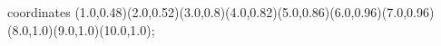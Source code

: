 					coordinates { (1.0,0.48)(2.0,0.52)(3.0,0.8)(4.0,0.82)(5.0,0.86)(6.0,0.96)(7.0,0.96)(8.0,1.0)(9.0,1.0)(10.0,1.0)};